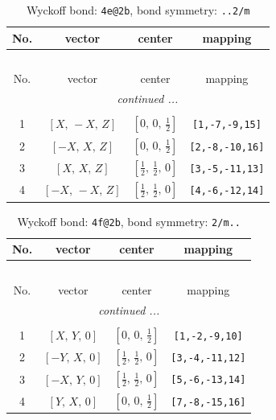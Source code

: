 \documentclass[fleqn,8pt]{jsarticle}
\begin{document}
\renewcommand{\arraystretch}{1.2}
\begin{longtable}{cccc}
\caption{Wyckoff bond: {\tt 4e@2b}, bond symmetry: {\tt ..2/m}}
 \\
 \hline \hline
No. & vector & center & mapping \\ \hline \endfirsthead

\multicolumn{3}{l}{\tablename\ \thetable{}} \\
 \hline \hline
No. & vector & center & mapping \\ \hline \endhead

 \hline \hline
\multicolumn{3}{r}{\footnotesize\it continued ...} \\ \endfoot

 \hline \hline
\multicolumn{3}{r}{} \\ \endlastfoot

1 & $\left[ X,\, - X,\, Z \right]$ & $\left[ 0,\, 0,\, \frac{1}{2} \right]$ & {\tt [1,-7,-9,15]} \\ \hline
2 & $\left[ - X,\, X,\, Z \right]$ & $\left[ 0,\, 0,\, \frac{1}{2} \right]$ & {\tt [2,-8,-10,16]} \\ \hline
3 & $\left[ X,\, X,\, Z \right]$ & $\left[ \frac{1}{2},\, \frac{1}{2},\, 0 \right]$ & {\tt [3,-5,-11,13]} \\ \hline
4 & $\left[ - X,\, - X,\, Z \right]$ & $\left[ \frac{1}{2},\, \frac{1}{2},\, 0 \right]$ & {\tt [4,-6,-12,14]} \\
\end{longtable}
\renewcommand{\arraystretch}{1.2}
\begin{longtable}{cccc}
\caption{Wyckoff bond: {\tt 4f@2b}, bond symmetry: {\tt 2/m..}}
 \\
 \hline \hline
No. & vector & center & mapping \\ \hline \endfirsthead

\multicolumn{3}{l}{\tablename\ \thetable{}} \\
 \hline \hline
No. & vector & center & mapping \\ \hline \endhead

 \hline \hline
\multicolumn{3}{r}{\footnotesize\it continued ...} \\ \endfoot

 \hline \hline
\multicolumn{3}{r}{} \\ \endlastfoot

1 & $\left[ X,\, Y,\, 0 \right]$ & $\left[ 0,\, 0,\, \frac{1}{2} \right]$ & {\tt [1,-2,-9,10]} \\ \hline
2 & $\left[ - Y,\, X,\, 0 \right]$ & $\left[ \frac{1}{2},\, \frac{1}{2},\, 0 \right]$ & {\tt [3,-4,-11,12]} \\ \hline
3 & $\left[ - X,\, Y,\, 0 \right]$ & $\left[ \frac{1}{2},\, \frac{1}{2},\, 0 \right]$ & {\tt [5,-6,-13,14]} \\ \hline
4 & $\left[ Y,\, X,\, 0 \right]$ & $\left[ 0,\, 0,\, \frac{1}{2} \right]$ & {\tt [7,-8,-15,16]} \\
\end{longtable}
\end{document}
